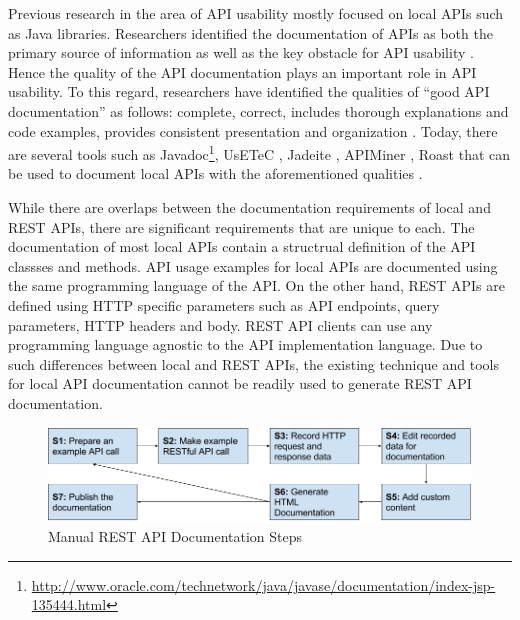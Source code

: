 Previous research in the area of API usability mostly focused on local APIs such as Java libraries. Researchers identified the documentation of APIs as both the primary source of information as well as the key obstacle for API usability \cite{Robillard_what_makes}. Hence the quality of the API documentation plays an important role in API usability. To this regard, researchers have identified the qualities of ``good API documentation'' as follows: complete, correct, includes thorough explanations and code examples, provides consistent presentation and organization \cite{Robillard_what_makes,Myers_study}. Today, there are several tools such as Javadoc\footnote{\url{http://www.oracle.com/technetwork/java/javase/documentation/index-jsp-135444.html}}, UsETeC \cite{zhu2014mining}, Jadeite \cite{Jadeite}, APIMiner \cite{montandon2013documenting}, Roast \cite{Hoffman_api_documentation} that can be used to document local APIs with the aforementioned qualities .

While there are overlaps between the documentation requirements of local and REST APIs, there are significant requirements that are unique to each. The documentation of most local APIs contain a structrual definition of the API classses and methods. API usage examples for local APIs are documented using the same programming language of the API. On the other hand, REST APIs are defined using HTTP specific parameters such as API endpoints, query parameters, HTTP headers and body. REST API clients can use any programming language agnostic to the API implementation language. Due to such differences between local and REST APIs, the existing technique and tools for local API documentation cannot be readily used to generate REST API documentation.

\begin{figure}[htb]
  \includegraphics[width=\linewidth]{manual_workflow.png}
  \caption{Manual REST API Documentation Steps}
  \label{fig:manual}
\end{figure}

